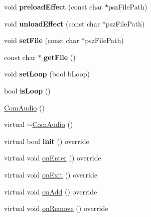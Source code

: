 \begin{DoxyCompactItemize}
\mbox{\label{classcocostudio_1_1ComAudio_a898a5e7826d856a79f82eaf06898d42a}} 
void {\bfseries preload\+Effect} (const char $\ast$psz\+File\+Path)
\item 
\mbox{\label{classcocostudio_1_1ComAudio_ac19bba88e051603a014f5e803aea975c}} 
void {\bfseries unload\+Effect} (const char $\ast$psz\+File\+Path)
\item 
\mbox{\label{classcocostudio_1_1ComAudio_a74e9d5164f3f4c031ecf880ded86e09d}} 
void {\bfseries set\+File} (const char $\ast$psz\+File\+Path)
\item 
\mbox{\label{classcocostudio_1_1ComAudio_a1e3b03a040487b235b4b1237ab0c9f00}} 
const char $\ast$ {\bfseries get\+File} ()
\item 
\mbox{\label{classcocostudio_1_1ComAudio_ac310f0db3c428428f18e9c63e17a21fa}} 
void {\bfseries set\+Loop} (bool b\+Loop)
\item 
\mbox{\label{classcocostudio_1_1ComAudio_ab9a2ba3f0069aad38aaf731c8473f13a}} 
bool {\bfseries is\+Loop} ()
\item 
\hyperlink{classcocostudio_1_1ComAudio_a52e8c138f67b2e5c515056844337a7b1}{Com\+Audio} ()
\item 
virtual \hyperlink{classcocostudio_1_1ComAudio_a049a5e9b9e8e0f07009a9410b253949e}{$\sim$\+Com\+Audio} ()
\item 
\mbox{\label{classcocostudio_1_1ComAudio_afbf7d8b57e6688d66a76445946d7849b}} 
virtual bool {\bfseries init} () override
\item 
virtual void \hyperlink{classcocostudio_1_1ComAudio_acd2c7848aec87f18156fe306ea12b668}{on\+Enter} () override
\item 
virtual void \hyperlink{classcocostudio_1_1ComAudio_a58e44679feee7fc40a2f1d54f1419248}{on\+Exit} () override
\item 
virtual void \hyperlink{classcocostudio_1_1ComAudio_a3c8592f027d9a5d0eb02aa122c80abcb}{on\+Add} () override
\item 
virtual void \hyperlink{classcocostudio_1_1ComAudio_afd3abbe481d2b98e6b9aee9299d38c5c}{on\+Remove} () override

\end{DoxyCompactItemize}
